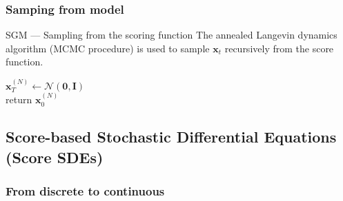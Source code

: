 \documentclass[10pt]{beamer}
\begin{document}
\subsubsection{Samping from model}
\begin{frame}{SGM --- \normalsize Sampling from the scoring function}
    The annealed Langevin dynamics algorithm (MCMC procedure) is used 
    to sample $\bm{x}_t$ recursively from the score function.

    \smallskip

    {\small\begin{algorithm}[H]
        \SetAlgoLined
        \BlankLine
    
        $\bm{x}_T^{(N)} \gets \mathcal{N}(\bm{0},\mathbf{I})$ \\
        return $\bm{x}_0^{(N)}$
        \caption{Sampling from SGM model (ALD algorithm)}
    \end{algorithm}}
\end{frame}


\subsection{Score-based  Stochastic Differential Equations (Score SDEs)}

\subsubsection{From discrete to continuous}
\end{document}
